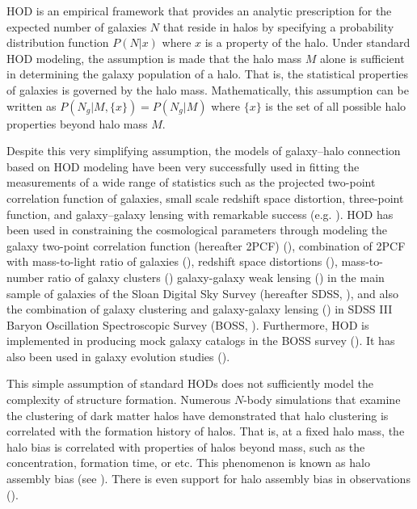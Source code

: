 \documentclass[12pt, preprint]{aastex}
\begin{document}
HOD is an empirical framework that provides an analytic prescription for the expected number of galaxies $N$ that reside in halos by specifying a probability distribution function $P(N|x)$ where $x$ is a property of the halo. Under standard HOD modeling, the assumption is made that the halo mass $M$ alone is sufficient in determining the galaxy population of a halo. That is, the statistical properties of galaxies is governed by the halo mass. Mathematically, this assumption can be written as $P(N_g|M,\{x\})=P(N_g|M)$ where $\{x\}$ is the set of all possible halo properties beyond halo mass $M$.

Despite this very simplifying assumption, the models of galaxy--halo connection based on HOD modeling have been very successfully used in fitting the measurements of a wide range of statistics such as the projected two-point correlation function of galaxies, small scale redshift space distortion, three-point function, and galaxy--galaxy lensing with remarkable success (e.g. \citealt{zheng07,tinker_rsd2007,zehavi2011,leauthaud12,parejko2013,coupon2015,hod-3pcf,guo2015,miyatake15,zu2015,hod_vs_sham}). 
HOD has been used in constraining the cosmological parameters through modeling the galaxy two-point correlation function (hereafter 2PCF) (\citealt{abazajian2005}), combination of 2PCF with mass-to-light ratio of galaxies (\citealt{tinker05}), redshift space distortions (\citealt{tinker_rsd2007}), mass-to-number ratio of galaxy clusters (\citealt{tinker2012}) galaxy-galaxy weak lensing (\citealt{vdb03,cacciato13,more13,vdb13}) in the main sample of galaxies
of the Sloan Digital Sky Survey (hereafter SDSS, \citealt{york2000}), and also the combination of galaxy clustering and galaxy-galaxy lensing (\citealt{more15}) in SDSS III Baryon Oscillation Spectroscopic Survey (BOSS, \citealt{boss}). Furthermore, HOD is implemented in producing mock galaxy catalogs in the BOSS survey (\citealt{manera2013,white2014}). It has also been used in galaxy evolution studies (\citealt{conroy09,leauthaud12,behroozi13,hudson2015,zu2015,zu2016}).

This simple assumption of standard HODs  
does not sufficiently model the complexity of structure formation. Numerous $N$-body simulations that examine the clustering of 
dark matter halos have demonstrated that halo clustering is correlated with the formation 
history of halos. That is, at a fixed halo mass, the halo bias is correlated 
with properties of halos beyond mass, such as the concentration, formation time, or etc. 
This phenomenon is known as halo assembly bias (see \citealt{sheth2004,gao2005, harker2006, weschler2006, gao2007,croton2007,wang2007,angulo2008,dalal2008,li2008,sunayama2016}). 
There is even support for halo assembly bias in observations (\citealt{miyatake2016,more2016}).
\end{document}
